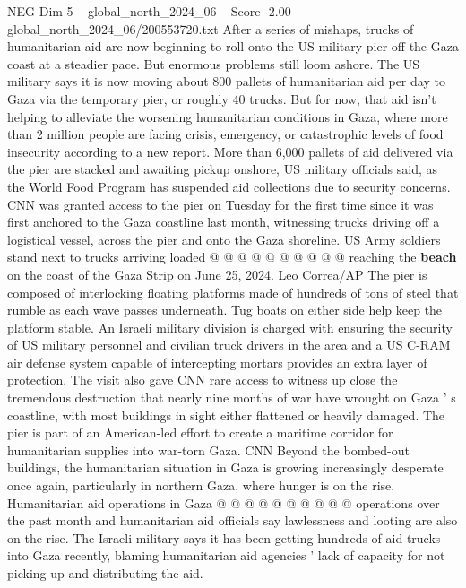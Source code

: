 \begin{textsample}{NEG Dim 5 – global\_north\_2024\_06 – Score -2.00 – global\_north\_2024\_06/200553720.txt}  \label{ex:f5_neg_081}
After a series of mishaps, trucks of humanitarian aid are now beginning to roll onto the US military pier off the Gaza coast at a steadier pace.
But enormous problems still loom ashore.
The US military says it is now moving about 800 pallets of humanitarian aid per day to Gaza via the temporary pier, or roughly 40 trucks.
But for now, that aid isn't helping to alleviate the worsening humanitarian conditions in Gaza, where more than 2 million people are facing crisis, emergency, or catastrophic levels of food insecurity according to a new report.
More than 6,000 pallets of aid delivered via the pier are stacked and awaiting pickup onshore, US military officials said, as the World Food Program has suspended aid collections due to security concerns.
CNN was granted access to the pier on Tuesday for the first time since it was first anchored to the Gaza coastline last month, witnessing trucks driving off a logistical vessel, across the pier and onto the Gaza shoreline.
US Army soldiers stand next to trucks arriving loaded @ @ @ @ @ @ @ @ @ @ reaching the \textbf{beach} on the coast of the Gaza Strip on June 25, 2024.
Leo Correa/AP The pier is composed of interlocking floating platforms made of hundreds of tons of steel that rumble as each wave passes underneath.
Tug boats on either side help keep the platform stable.
An Israeli military division is charged with ensuring the security of US military personnel and civilian truck drivers in the area and a US C-RAM air defense system capable of intercepting mortars provides an extra layer of protection.
The visit also gave CNN rare access to witness up close the tremendous destruction that nearly nine months of war have wrought on Gaza ' s coastline, with most buildings in sight either flattened or heavily damaged.
The pier is part of an American-led effort to create a maritime corridor for humanitarian supplies into war-torn Gaza.
CNN Beyond the bombed-out buildings, the humanitarian situation in Gaza is growing increasingly desperate once again, particularly in northern Gaza, where hunger is on the rise.
Humanitarian aid operations in Gaza @ @ @ @ @ @ @ @ @ @ operations over the past month and humanitarian aid officials say lawlessness and looting are also on the rise.
The Israeli military says it has been getting hundreds of aid trucks into Gaza recently, blaming humanitarian aid agencies ' lack of capacity for not picking up and distributing the aid.

\end{textsample}
